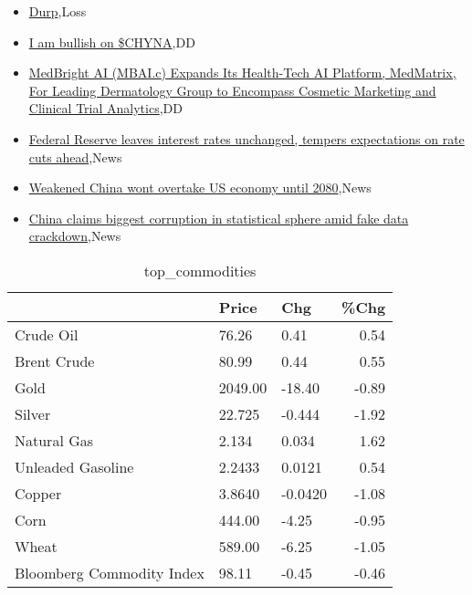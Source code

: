 \documentclass{article}%
\begin{document}
%
\begin{itemize}%
\item%
\href{https://reddit.com/r/wallstreetbets/comments/1ag940i/durp/}{Durp},Loss%
\item%
\href{https://reddit.com/r/wallstreetbets/comments/1ag3h98/i\_am\_bullish\_on\_chyna/}{I am bullish on \$CHYNA},DD%
\item%
\href{https://reddit.com/r/Baystreetbets/comments/1afxmkm/medbright\_ai\_mbaic\_expands\_its\_healthtech\_ai/}{MedBright AI (MBAI.c) Expands Its Health-Tech AI Platform, MedMatrix, For Leading Dermatology Group to Encompass Cosmetic Marketing and Clinical Trial Analytics},DD%
\item%
\href{https://reddit.com/r/StockMarket/comments/1afqe51/federal\_reserve\_leaves\_interest\_rates\_unchanged/}{Federal Reserve leaves interest rates unchanged, tempers expectations on rate cuts ahead},News%
\item%
\href{https://reddit.com/r/Economics/comments/1ag5vj1/weakened\_china\_wont\_overtake\_us\_economy\_until\_2080/}{Weakened China wont overtake US economy until 2080},News%
\item%
\href{https://reddit.com/r/Economics/comments/1ag02db/china\_claims\_biggest\_corruption\_in\_statistical/}{China claims biggest corruption in statistical sphere amid fake data crackdown},News%
\end{itemize}%


\begin{table}[htbp]%
\caption{top\_commodities}%
\centering%
\begin{adjustbox}{width=1\textwidth}%
\begin{tabular}{lllr}
\toprule
                          &   Price &     Chg &  \%Chg \\
\midrule
               Crude Oil  &   76.26 &    0.41 &  0.54 \\
             Brent Crude  &   80.99 &    0.44 &  0.55 \\
                    Gold  & 2049.00 &  -18.40 & -0.89 \\
                  Silver  &  22.725 &  -0.444 & -1.92 \\
             Natural Gas  &   2.134 &   0.034 &  1.62 \\
       Unleaded Gasoline  &  2.2433 &  0.0121 &  0.54 \\
                  Copper  &  3.8640 & -0.0420 & -1.08 \\
                    Corn  &  444.00 &   -4.25 & -0.95 \\
                   Wheat  &  589.00 &   -6.25 & -1.05 \\
Bloomberg Commodity Index &   98.11 &   -0.45 & -0.46 \\
\bottomrule
\end{tabular}
%
\end{adjustbox}%
\end{table}
\end{document}
